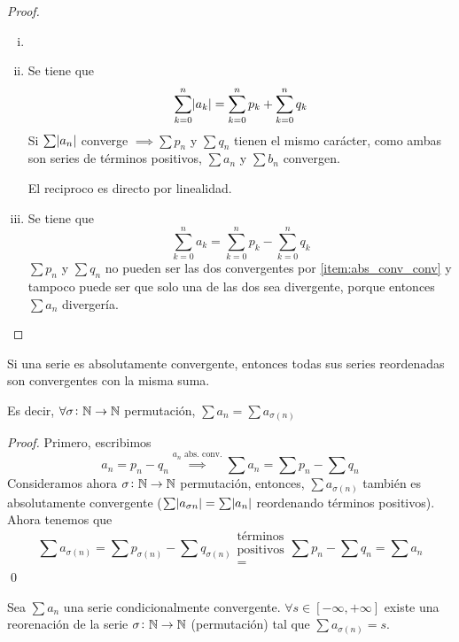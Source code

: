 \begin{proof}
  \begin{enumerate}[i)]
  	\item[]
  	\item Se tiene que
			\[
				\sum\limits_{k=0}^ n \abs{a_k} = \sum\limits_{k=0}^ n p_k + \sum\limits_{k=0}^n q_k
    	\]
    	Si $\sum \abs{a_n}$ converge $\implies \sum p_n$ y $\sum q_n$ tienen el mismo carácter,
			como ambas son series de términos positivos, $\sum a_n$ y $\sum b_n$ convergen.

			El reciproco es directo por linealidad.
		\item Se tiene que
			\[
				\sum_{k=0}^n a_k = \sum_{k=0}^n p_k - \sum_{k=0}^n q_k
			\]
			$\sum p_n$ y $\sum q_n$ no pueden ser las dos convergentes por \ref{item:abs_conv_conv}
			y tampoco puede ser que solo una de las dos sea divergente, porque entonces
			$\sum a_n$ divergería.
  \end{enumerate}
\end{proof}

\begin{prop}
	Si una serie es absolutamente convergente, entonces todas sus series reordenadas
	son convergentes con la misma suma.

	Es decir, $\forall \sigma \colon \mathbb{N} \to \mathbb{N}$ permutación, $\sum a_n = \sum a_{\sigma(n)}$
\end{prop}

\begin{proof}
	Primero, escribimos
	\[
		a_n = p_n - q_n \stackrel{\text{$a_n$ abs. conv.}}{\implies}
		\sum a_n = \sum p_n - \sum q_n
	\]
	Consideramos ahora $\sigma \colon \mathbb{N} \to \mathbb{N}$ permutación, entonces, $\sum a_{\sigma(n)}$
	también es absolutamente convergente ($\sum \abs{a_{\sigma{n}}} = \sum \abs{a_n}$
	reordenando términos positivos). Ahora tenemos que
	\[
		\sum a_{\sigma(n)} = \sum p_{\sigma(n)} - \sum q_{\sigma(n)}
		\substack{\text{términos} \\ \text{positivos} \\ =} \sum p_n - \sum q_n = \sum a_n
	\]
	\qed
\end{proof}

\begin{teo}
	Sea $\sum a_n$ una serie condicionalmente convergente. $\forall s \in [-\infty,+\infty]$
	existe una reorenación de la serie $\sigma \colon \mathbb{N} \to \mathbb{N}$ (permutación) tal que
	$\sum a_{\sigma(n)} = s$.
\end{teo}

